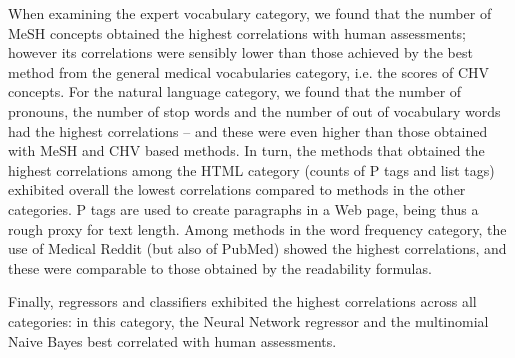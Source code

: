 When examining the expert vocabulary category, we found that the number of MeSH concepts obtained the highest correlations with human assessments; however its correlations were sensibly lower than those achieved by the best method from the general medical vocabularies category, i.e. the scores of CHV concepts. For the natural language category, we found that the number of pronouns, the number of stop words and the number of out of vocabulary words had the highest correlations -- and these were even higher than those obtained with MeSH and CHV based methods. In turn, the methods that obtained the highest correlations among the HTML category (counts of P tags and list tags) exhibited overall the lowest correlations compared to methods in the other categories. P tags are used to create paragraphs in a Web page, being thus a rough proxy for text length. 
Among methods in the word frequency category, the use of Medical Reddit (but also of PubMed) showed the highest correlations, and these were comparable to those obtained by the readability formulas. 





Finally, regressors and classifiers exhibited the highest correlations across all categories: in this  category, the  Neural Network regressor and the multinomial Naive Bayes best correlated with human assessments. 

%

%


